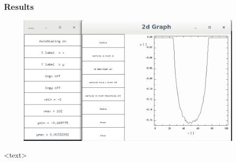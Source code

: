 \documentclass{beamer}
\begin{document}
\begin{frame}
\frametitle{Results}
\begin{figure}
\includegraphics[scale=0.2]{A2p3}
\caption{}
\end{figure}
<text>
\end{frame}
\end{document}
